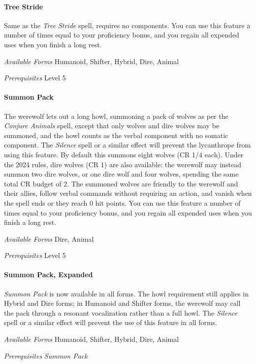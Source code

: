 \documentclass[twocolumn]{dndbook}
\begin{document}
\paragraph*{Tree Stride}
Same as the \emph{Tree Stride} spell, requires no components.
You can use this feature a number of times equal to your proficiency bonus, and you regain all expended uses when you finish a long rest.\par
\emph{Available Forms} Humanoid, Shifter, Hybrid, Dire, Animal\par
\emph{Prerequisites} Level 5\par

\paragraph*{Summon Pack}
The werewolf lets out a long howl, summoning a pack of wolves as per the \emph{Conjure Animals} spell, except that only wolves and dire wolves may be summoned, and the howl counts as the verbal component with no somatic component.
The \emph{Silence} spell or a similar effect will prevent the lycanthrope from using this feature.
By default this summons eight wolves (CR 1/4 each).
Under the 2024 rules, dire wolves (CR 1) are also available: the werewolf may instead summon two dire wolves, or one dire wolf and four wolves, spending the same total CR budget of 2.
The summoned wolves are friendly to the werewolf and their allies, follow verbal commands without requiring an action, and vanish when the spell ends or they reach 0 hit points.
You can use this feature a number of times equal to your proficiency bonus, and you regain all expended uses when you finish a long rest.\par
\emph{Available Forms} Dire, Animal\par
\emph{Prerequisites} Level 5\par

\paragraph*{Summon Pack, Expanded}
\emph{Summon Pack} is now available in all forms.
The howl requirement still applies in Hybrid and Dire forms; in Humanoid and Shifter forms, the werewolf may call the pack through a resonant vocalization rather than a full howl.
The \emph{Silence} spell or a similar effect will prevent the use of this feature in all forms.\par
\emph{Available Forms} Humanoid, Shifter, Hybrid, Dire, Animal\par
\emph{Prerequisites} \emph{Summon Pack}\par
\end{document}
